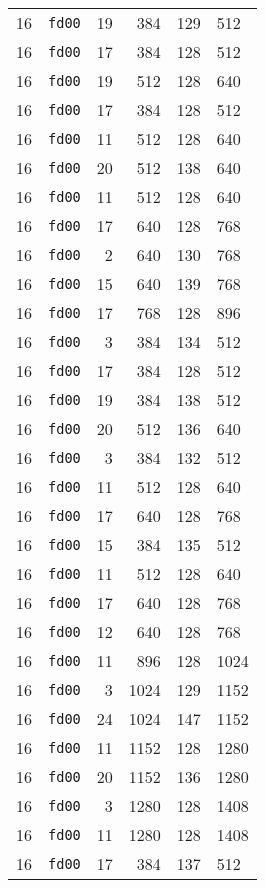 \documentclass{article}
\begin{document}
\begin{table}[h!]
\begin{tabular}{llrrrl}
    16 & \texttt{fd00} & 19 & 384 & 129 & 512 \\
    16 & \texttt{fd00} & 17 & 384 & 128 & 512 \\
    16 & \texttt{fd00} & 19 & 512 & 128 & 640 \\
    16 & \texttt{fd00} & 17 & 384 & 128 & 512 \\
    16 & \texttt{fd00} & 11 & 512 & 128 & 640 \\
    16 & \texttt{fd00} & 20 & 512 & 138 & 640 \\
    16 & \texttt{fd00} & 11 & 512 & 128 & 640 \\
    16 & \texttt{fd00} & 17 & 640 & 128 & 768 \\
    16 & \texttt{fd00} & 2 & 640 & 130 & 768 \\
    16 & \texttt{fd00} & 15 & 640 & 139 & 768 \\
    16 & \texttt{fd00} & 17 & 768 & 128 & 896 \\
    16 & \texttt{fd00} & 3 & 384 & 134 & 512 \\
    16 & \texttt{fd00} & 17 & 384 & 128 & 512 \\
    16 & \texttt{fd00} & 19 & 384 & 138 & 512 \\
    16 & \texttt{fd00} & 20 & 512 & 136 & 640 \\
    16 & \texttt{fd00} & 3 & 384 & 132 & 512 \\
    16 & \texttt{fd00} & 11 & 512 & 128 & 640 \\
    16 & \texttt{fd00} & 17 & 640 & 128 & 768 \\
    16 & \texttt{fd00} & 15 & 384 & 135 & 512 \\
    16 & \texttt{fd00} & 11 & 512 & 128 & 640 \\
    16 & \texttt{fd00} & 17 & 640 & 128 & 768 \\
    16 & \texttt{fd00} & 12 & 640 & 128 & 768 \\
    16 & \texttt{fd00} & 11 & 896 & 128 & 1024 \\
    16 & \texttt{fd00} & 3 & 1024 & 129 & 1152 \\
    16 & \texttt{fd00} & 24 & 1024 & 147 & 1152 \\
    16 & \texttt{fd00} & 11 & 1152 & 128 & 1280 \\
    16 & \texttt{fd00} & 20 & 1152 & 136 & 1280 \\
    16 & \texttt{fd00} & 3 & 1280 & 128 & 1408 \\
    16 & \texttt{fd00} & 11 & 1280 & 128 & 1408 \\
    16 & \texttt{fd00} & 17 & 384 & 137 & 512 \\

\end{tabular}
\end{table}
\end{document}
